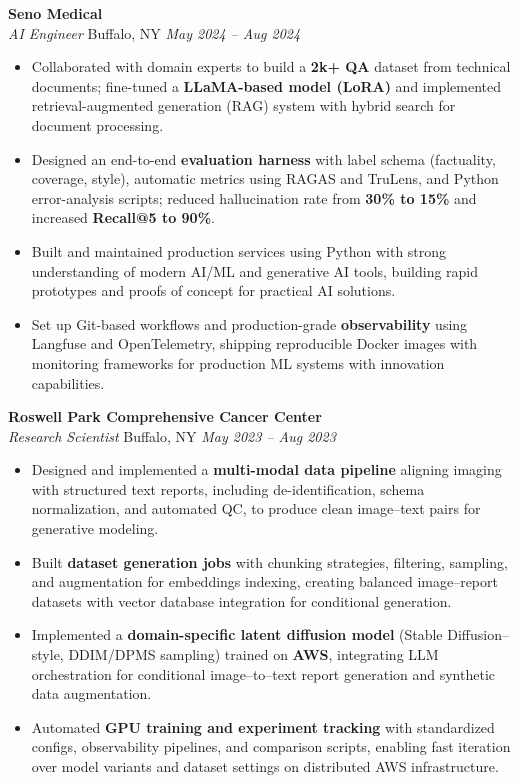\vspace*{-1pt}
\item \textbf{Seno Medical}\\
\textit{AI Engineer} \hfill Buffalo, NY \quad \textit{May 2024 -- Aug 2024}
\vspace*{-3pt}
\begin{itemize}[leftmargin=0.2in, topsep=1pt]
  \item Collaborated with domain experts to build a \textbf{2k+ QA} dataset from technical documents; fine-tuned a \textbf{LLaMA-based model (LoRA)} and implemented retrieval-augmented generation (RAG) system with hybrid search for document processing.
  \item Designed an end-to-end \textbf{evaluation harness} with label schema (factuality, coverage, style), automatic metrics using RAGAS and TruLens, and Python error-analysis scripts; reduced hallucination rate from \textbf{30\% to 15\%} and increased \textbf{Recall@5 to 90\%}.
  \item Built and maintained production services using Python with strong understanding of modern AI/ML and generative AI tools, building rapid prototypes and proofs of concept for practical AI solutions.
  \item Set up Git-based workflows and production-grade \textbf{observability} using Langfuse and OpenTelemetry, shipping reproducible Docker images with monitoring frameworks for production ML systems with innovation capabilities.
\end{itemize}

\vspace*{-1pt}
\item \textbf{Roswell Park Comprehensive Cancer Center}\\
\textit{Research Scientist} \hfill Buffalo, NY \quad \textit{May 2023 -- Aug 2023}
\vspace*{-3pt}
\begin{itemize}[leftmargin=0.2in, topsep=1pt]
  \item Designed and implemented a \textbf{multi-modal data pipeline} aligning imaging with structured text reports, including de-identification, schema normalization, and automated QC, to produce clean image–text pairs for generative modeling.
  \item Built \textbf{dataset generation jobs} with chunking strategies, filtering, sampling, and augmentation for embeddings indexing, creating balanced image–report datasets with vector database integration for conditional generation.
  \item Implemented a \textbf{domain-specific latent diffusion model} (Stable Diffusion–style, DDIM/DPMS sampling) trained on \textbf{AWS}, integrating LLM orchestration for conditional image–to–text report generation and synthetic data augmentation.
  \item Automated \textbf{GPU training and experiment tracking} with standardized configs, observability pipelines, and comparison scripts, enabling fast iteration over model variants and dataset settings on distributed AWS infrastructure.
\end{itemize}
